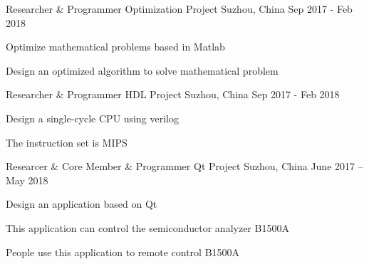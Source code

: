 

\begin{cventries}

  \cventry
    {Researcher \& Programmer} %
    {Optimization Project} %
    {Suzhou, China} %
    {Sep 2017 - Feb 2018} %
    {
      \begin{cvitems} %
        \item {Optimize mathematical problems based in Matlab}
        \item {Design an optimized algorithm to solve mathematical problem}
      \end{cvitems}
    }

  \cventry
    {Researcher \& Programmer} %
    {HDL Project} %
    {Suzhou, China} %
    {Sep 2017 - Feb 2018} %
    {
      \begin{cvitems} %
        \item {Design a single-cycle CPU using verilog}
        \item {The instruction set is MIPS}
      \end{cvitems}
    }

  \cventry
    {Researcer \& Core Member \& Programmer} %
    {Qt Project} %
    {Suzhou, China} %
    {June 2017 – May 2018} %
    {
      \begin{cvitems} %
        \item {Design an application based on Qt}
        \item {This application can control the semiconductor analyzer B1500A}
        \item {People use this application to remote control B1500A}
      \end{cvitems}
    }


\end{cventries}
